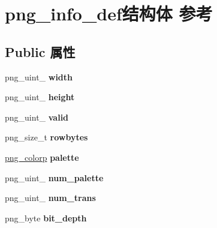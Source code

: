 \hypertarget{structpng__info__def}{}\section{png\+\_\+info\+\_\+def结构体 参考}
\label{structpng__info__def}
\subsection*{Public 属性}
\begin{DoxyCompactItemize}
\item 
\mbox{\label{structpng__info__def_ac487ded925efc3985d1f6f873d2f2014}} 
png\+\_\+uint\+\_ {\bfseries width}
\item 
\mbox{\label{structpng__info__def_ade3d79dce8b63cbfdd6150c4c30e51f4}} 
png\+\_\+uint\+\_ {\bfseries height}
\item 
\mbox{\label{structpng__info__def_a8695fb4fae2b7d0c8a5be4f4c563aa8a}} 
png\+\_\+uint\+\_ {\bfseries valid}
\item 
\mbox{\label{structpng__info__def_ad8db9ce83eb9f443fddd006a2d0d6589}} 
png\+\_\+size\+\_\+t {\bfseries rowbytes}
\item 
\mbox{\label{structpng__info__def_af032d4977f69766baf6ed147abc5ee27}} 
\hyperlink{structpng__color__struct}{png\+\_\+colorp} {\bfseries palette}
\item 
\mbox{\label{structpng__info__def_aa7b651d53768b70da1910bf750ddb341}} 
png\+\_\+uint\+\_ {\bfseries num\+\_\+palette}
\item 
\mbox{\label{structpng__info__def_ac088b6ab245f61f474ba56a66ec7e787}} 
png\+\_\+uint\+\_ {\bfseries num\+\_\+trans}
\item 
\mbox{\label{structpng__info__def_a437ea0466fea89c1794a8e3aa8d4da9e}} 
png\+\_\+byte {\bfseries bit\+\_\+depth}
\item 
\mbox{\label{structpng__info__def_aa89dde7a6d87c229e9a4d6313fb4537b}} 

\end{DoxyCompactItemize}
